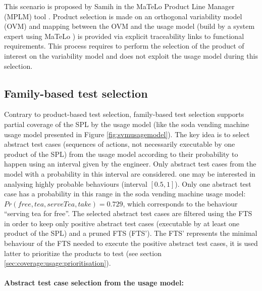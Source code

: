 This scenario is proposed by Samih \etal \cite{Samih2014,Samih2014b} in the MaTeLo Product Line Manager (MPLM) tool \cite{Samih2014c}.  Product selection is made on an orthogonal variability model (OVM) and mapping between the OVM and the usage model (build by a system expert using MaTeLo \cite{matelo}) is provided via explicit traceability links to functional requirements. This process requires to perform the selection of the product of interest on the variability model and does not exploit the usage model during this selection. 


\subsection{Family-based test selection}

Contrary to product-based test selection, family-based test selection supports partial coverage of the SPL by the usage model (like the soda vending machine usage model presented in Figure \ref{fig:svmusagemodel}). 
The key idea is to select abstract test cases (\ie sequences of actions, not necessarily executable by one product of the SPL) from the usage model according to their probability to happen using an interval given by the engineer. Only abstract test cases from the model with a probability in this interval are considered. \Eg one may be interested in analysing highly probable behaviours (interval $[0.5 , 1]$). Only one abstract test case has a probability in this range in the soda vending machine usage model: $Pr(free, tea,serveTea,take) = 0.729$, which corresponds to the behaviour ``serving tea for free''.
The selected abstract test cases are filtered using the FTS in order to keep only positive abstract test cases (executable by at least one product of the SPL) and a pruned FTS (FTS'). The FTS' represents the minimal behaviour of the FTS needed to execute the positive abstract test cases, it is used latter to prioritize the products to test (see section \ref{sec:coverage:usage:prioritisation}).

\paragraph{Abstract test case selection from the usage model:}

